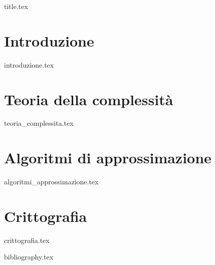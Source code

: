 \documentclass[a4paper,11pt,oneside]{book}
\begin{document}

\frontmatter

{title.tex}

\tableofcontents

\mainmatter


\chapter{Introduzione}
{introduzione.tex}

\chapter{Teoria della complessità}
{teoria_complessita.tex}

\chapter{Algoritmi di approssimazione}
{algoritmi_approssimazione.tex}

\chapter{Crittografia}
{crittografia.tex}

\cleardoublepage

{bibliography.tex}
\end{document}
